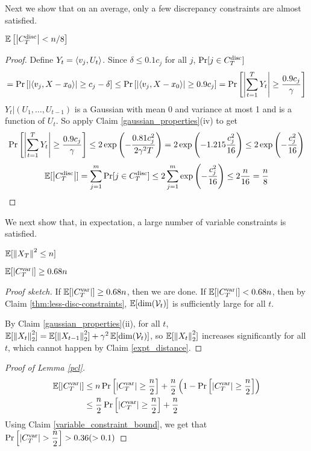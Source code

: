 Next we show that on an average, only a few discrepancy constraints are almost satisfied.
\begin{Claim}
\label{thm:less-disc-constraints}
$\operatorname{\mathbb{E}}\left[\left\lvert C^{\mathrm{disc}}_T \right\rvert < n/8 \right]$
\end{Claim}
\begin{proof}
Define $Y_t = \left\langle v_j,U_t\right\rangle$. Since $\delta \le 0.1 c_j$ for all $j$, $\Pr[j \in C^{\mathrm{disc}}_T]$
\[ = \Pr\left[ \left\lvert \left\langle v_j, X - x_0\right\rangle \right\rvert \ge c_j - \delta \right]
\le \Pr\left[ \left\lvert \left\langle v_j, X - x_0\right\rangle \right\rvert \ge 0.9c_j \right]
= \Pr\left[ \left\lvert \sum_{t=1}^T Y_t \right\rvert \ge \frac{0.9c_j}{\gamma} \right] \]
$Y_t|(U_1,\hdots,U_{t-1})$ is a Gaussian with mean 0 and variance at most 1 and is a function of $U_t$.
So apply Claim \ref{gaussian_properties}(iv) to get
\[ \Pr\left[ \left\lvert \sum_{t=1}^T Y_t \right\rvert \ge \frac{0.9c_j}{\gamma} \right]
\le 2\exp\left(-\frac{0.81 c_j^2}{2\gamma^2T}\right)
= 2\exp\left(-1.215 \frac{c_j^2}{16}\right)
\le 2\exp\left(-\frac{c_j^2}{16}\right) \]
\[ \operatorname{\mathbb{E}}[\left\lvert C^{\mathrm{disc}}_T \right\rvert]
= \sum_{j=1}^m \Pr[j \in C^{\mathrm{disc}}_T]
\le 2\sum_{j=1}^m \exp\left(-\frac{c_j^2}{16}\right)
\le 2\frac{n}{16} = \frac{n}{8} \]
\end{proof}

We next show that, in expectation, a large number of variable constraints is satisfied.
\begin{Claim} \label{expt_distance}
$\operatorname{\mathbb{E}}[\left\lVert X_T \right\rVert^2 \leq n]$
\end{Claim}
\begin{Claim} \label{variable_constraint_bound}
$\operatorname{\mathbb{E}}[\left\lvert C^{\mathrm{var}}_T \right\rvert] \geq 0.68n$
\end{Claim}
\begin{proof}[Proof sketch]
If $\operatorname{\mathbb{E}}[\left\lvert C^{\mathrm{var}}_T \right\rvert] \ge 0.68n$, then we are done.
If $\operatorname{\mathbb{E}}[\left\lvert C^{\mathrm{var}}_T \right\rvert] < 0.68n$, then by Claim \ref{thm:less-disc-constraints},
$\operatorname{\mathbb{E}}[\dim(\mathcal{V}_t)]$ is sufficiently large for all $t$.

By Claim \ref{gaussian_properties}(ii), for all $t$,
$\operatorname{\mathbb{E}}[\left\lVert X_t \right\rVert_2^2] = \operatorname{\mathbb{E}}[\left\lVert X_{t-1} \right\rVert_2^2] + \gamma^2\operatorname{\mathbb{E}}[\dim(\mathcal{V}_t)]$,
so $\operatorname{\mathbb{E}}[\left\lVert X_t \right\rVert_2^2]$ increases significantly for all $t$,
which cannot happen by Claim \ref{expt_distance}.
\end{proof}

\begin{proof}[Proof of Lemma \ref{pcl}]
\begin{align*}
\operatorname{\mathbb{E}}[\left\lvert C^{\mathrm{var}}_T \right\rvert]
&\leq n\Pr\left[\left\lvert C^{\mathrm{var}}_T \right\rvert \geq \dfrac{n}{2}\right] + \dfrac{n}{2}\left(1- \Pr\left[\left\lvert C^{\mathrm{var}}_T \right\rvert \geq \dfrac{n}{2}\right] \right )\\
&\leq \dfrac{n}{2}\Pr\left[\left\lvert C^{\mathrm{var}}_T \right\rvert \geq \dfrac{n}{2}\right]  + \dfrac{n}{2}
\end{align*}
Using Claim \ref{variable_constraint_bound}, we get that $\Pr\left[\left\lvert C^{\mathrm{var}}_T \right\rvert > \dfrac{n}{2}\right] > 0.36 (> 0.1)$
\end{proof}


